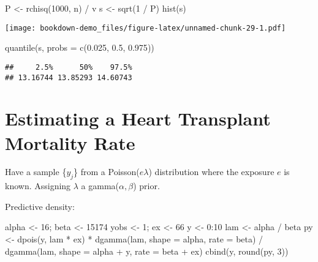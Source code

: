 \documentclass[
]{book}
\newenvironment{Shaded}{\begin{snugshade}}{\end{snugshade}}
\newcommand{\AttributeTok}[1]{\textcolor[rgb]{0.77,0.63,0.00}{#1}}
\newcommand{\DecValTok}[1]{\textcolor[rgb]{0.00,0.00,0.81}{#1}}
\newcommand{\FloatTok}[1]{\textcolor[rgb]{0.00,0.00,0.81}{#1}}
\newcommand{\FunctionTok}[1]{\textcolor[rgb]{0.00,0.00,0.00}{#1}}
\newcommand{\NormalTok}[1]{#1}
\newcommand{\OtherTok}[1]{\textcolor[rgb]{0.56,0.35,0.01}{#1}}
\newcommand{\SpecialCharTok}[1]{\textcolor[rgb]{0.00,0.00,0.00}{#1}}
\begin{document}
\begin{Shaded}
\begin{Highlighting}[]
\NormalTok{P }\OtherTok{\textless{}{-}} \FunctionTok{rchisq}\NormalTok{(}\DecValTok{1000}\NormalTok{, n) }\SpecialCharTok{/}\NormalTok{ v}
\NormalTok{s }\OtherTok{\textless{}{-}} \FunctionTok{sqrt}\NormalTok{(}\DecValTok{1} \SpecialCharTok{/}\NormalTok{ P)}
\FunctionTok{hist}\NormalTok{(s)}
\end{Highlighting}
\end{Shaded}

\texttt{[image: bookdown-demo\_files/figure-latex/unnamed-chunk-29-1.pdf]}

\begin{Shaded}
\begin{Highlighting}[]
\FunctionTok{quantile}\NormalTok{(s, }\AttributeTok{probs =} \FunctionTok{c}\NormalTok{(}\FloatTok{0.025}\NormalTok{, }\FloatTok{0.5}\NormalTok{, }\FloatTok{0.975}\NormalTok{))}
\end{Highlighting}
\end{Shaded}

\begin{verbatim}
##     2.5%      50%    97.5% 
## 13.16744 13.85293 14.60743
\end{verbatim}

\hypertarget{estimating-a-heart-transplant-mortality-rate}{%
\section{Estimating a Heart Transplant Mortality Rate}\label{estimating-a-heart-transplant-mortality-rate}}

Have a sample \{\(y_j\)\} from a Poisson(\(e \lambda\)) distribution where the exposure \(e\) is known. Assigning \(\lambda\) a gamma(\(\alpha, \beta\)) prior.

Predictive density:

\begin{Shaded}
\begin{Highlighting}[]
\NormalTok{alpha }\OtherTok{\textless{}{-}} \DecValTok{16}\NormalTok{; beta }\OtherTok{\textless{}{-}} \DecValTok{15174}
\NormalTok{yobs }\OtherTok{\textless{}{-}} \DecValTok{1}\NormalTok{; ex }\OtherTok{\textless{}{-}} \DecValTok{66}
\NormalTok{y }\OtherTok{\textless{}{-}} \DecValTok{0}\SpecialCharTok{:}\DecValTok{10}
\NormalTok{lam }\OtherTok{\textless{}{-}}\NormalTok{ alpha }\SpecialCharTok{/}\NormalTok{ beta}
\NormalTok{py }\OtherTok{\textless{}{-}} \FunctionTok{dpois}\NormalTok{(y, lam }\SpecialCharTok{*}\NormalTok{ ex) }\SpecialCharTok{*} 
  \FunctionTok{dgamma}\NormalTok{(lam, }\AttributeTok{shape =}\NormalTok{ alpha, }\AttributeTok{rate =}\NormalTok{ beta) }\SpecialCharTok{/} 
  \FunctionTok{dgamma}\NormalTok{(lam, }\AttributeTok{shape =}\NormalTok{ alpha }\SpecialCharTok{+}\NormalTok{ y, }\AttributeTok{rate =}\NormalTok{ beta }\SpecialCharTok{+}\NormalTok{ ex)}
\FunctionTok{cbind}\NormalTok{(y, }\FunctionTok{round}\NormalTok{(py, }\DecValTok{3}\NormalTok{))}
\end{Highlighting}
\end{Shaded}
\end{document}
